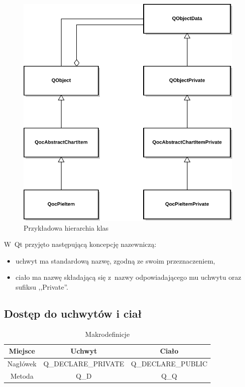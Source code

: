 \begin{figure}[H]
\centering
\includegraphics[scale=0.8]{img/dpointer.pdf}
\caption{Przykładowa hierarchia klas}\label{rys:dpointer}
\end{figure}

W~Qt przyjęto następującą koncepcję nazewniczą:
\begin{itemize}
\item{uchwyt ma standardową nazwę, zgodną ze swoim przeznaczeniem,}
\item{ciało ma nazwę składającą się z~nazwy odpowiadającego mu uchwytu oraz sufiksu ,,Private''.}
\end{itemize}


\subsection{Dostęp do uchwytów i ciał}

\begin{table}[h]\footnotesize
\centering
\caption{Makrodefinicje}
\label{tab:makra}
\begin{tabular}{|c|c|c|}
\hline
Miejsce & Uchwyt & Ciało\\
\hline
Nagłówek & Q\_DECLARE\_PRIVATE & Q\_DECLARE\_PUBLIC\\
\hline
Metoda & Q\_D & Q\_Q\\
\hline
\end{tabular}
\end{table}

